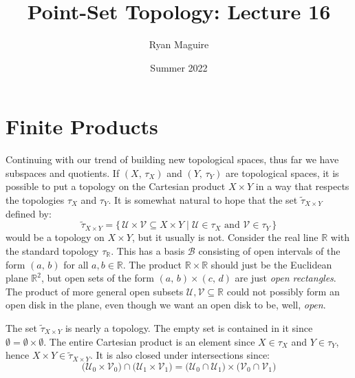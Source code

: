 \documentclass{article}
\title{Point-Set Topology: Lecture 16}
\author{Ryan Maguire}
\date{Summer 2022}
\theoremstyle{plain}
\theoremstyle{normal}
\begin{document}
    \maketitle
    \section{Finite Products}
        Continuing with our trend of building new topological spaces, thus far
        we have subspaces and quotients. If $(X,\,\tau_{X})$ and
        $(Y,\,\tau_{Y})$ are topological spaces, it is possible to put a
        topology on the Cartesian product $X\times{Y}$ in a way that respects
        the topologies $\tau_{X}$ and $\tau_{Y}$. It is somewhat natural to hope
        that the set $\tilde{\tau}_{X\times{Y}}$ defined by:
        \begin{equation}
            \tilde{\tau}_{X\times{Y}}=
            \{\,\mathcal{U}\times\mathcal{V}\subseteq{X}\times{Y}\;|\;
                \mathcal{U}\in\tau_{X}\textrm{ and }\mathcal{V}\in\tau_{Y}\,\}
        \end{equation}
        would be a topology on $X\times{Y}$, but it usually is not. Consider the
        real line $\mathbb{R}$ with the standard topology $\tau_{\mathbb{R}}$.
        This has a basis $\mathcal{B}$ consisting of open intervals of the
        form $(a,\,b)$ for all $a,b\in\mathbb{R}$. The product
        $\mathbb{R}\times\mathbb{R}$ should just be the Euclidean plane
        $\mathbb{R}^{2}$, but open sets of the form $(a,\,b)\times(c,\,d)$ are
        just \textit{open rectangles}. The product of more general open subsets
        $\mathcal{U},\mathcal{V}\subseteq\mathbb{R}$ could not possibly form an
        open disk in the plane, even though we want an open disk to be, well,
        \textit{open}.
        \par\hfill\par
        The set $\tilde{\tau}_{X\times{Y}}$ is
        nearly a topology. The empty set is contained in it since
        $\emptyset=\emptyset\times\emptyset$. The entire Cartesian product is
        an element since $X\in\tau_{X}$ and $Y\in\tau_{Y}$, hence
        $X\times{Y}\in\tilde{\tau}_{X\times{Y}}$. It is also closed under
        intersections since:
        \begin{equation}
            \big(\mathcal{U}_{0}\times\mathcal{V}_{0}\big)\cap
            \big(\mathcal{U}_{1}\times\mathcal{V}_{1}\big)
            =\big(\mathcal{U}_{0}\cap\mathcal{U}_{1}\big)\times
            \big(\mathcal{V}_{0}\cap\mathcal{V}_{1}\big)
        \end{equation}
\end{document}
